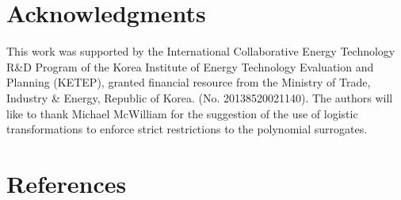 \documentclass[preprint,12pt]{elsarticle}
\begin{document}

\section{Acknowledgments}

This work was supported by the International Collaborative Energy Technology R\&D Program of the Korea Institute of Energy Technology Evaluation and Planning (KETEP), granted financial resource from the Ministry of Trade, Industry \& Energy, Republic of Korea. (No. 20138520021140). The authors will like to thank Michael McWilliam for the suggestion of the use of logistic transformations to enforce strict restrictions to the polynomial surrogates.




\section*{References}
\small




\begin{thebibliography}{00}


\end{thebibliography}
\end{document}
